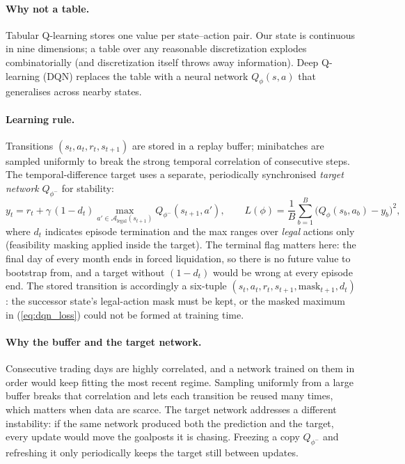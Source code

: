 \paragraph{Why not a table.} Tabular Q-learning stores one value per
state--action pair. Our state is continuous in nine dimensions; a table
over any reasonable discretization explodes combinatorially (and
discretization itself throws away information). Deep Q-learning (DQN)
replaces the table with a neural network $Q_\phi(s,a)$ that generalises
across nearby states.

\paragraph{Learning rule.} Transitions $(s_t,a_t,r_t,s_{t+1})$ are stored
in a replay buffer; minibatches are sampled uniformly to break the strong
temporal correlation of consecutive steps. The temporal-difference target
uses a separate, periodically synchronised \emph{target network}
$Q_{\phi^-}$ for stability:
\begin{equation}
y_t = r_t + \gamma\, (1-d_t) \max_{a' \in \mathcal{A}_{\mathrm{legal}}(s_{t+1})}
      Q_{\phi^-}(s_{t+1}, a'),
\qquad
L(\phi) = \frac{1}{B}\sum_{b=1}^{B} \bigl( Q_\phi(s_b,a_b) - y_b \bigr)^2 ,
\label{eq:dqn_loss}
\end{equation}
where $d_t$ indicates episode termination and the max ranges over
\emph{legal} actions only (feasibility masking applied inside the target).
The terminal flag matters here: the final day of every month ends in
forced liquidation, so there is no future value to bootstrap from, and a
target without $(1-d_t)$ would be wrong at every episode end. The stored
transition is accordingly a six-tuple
$(s_t, a_t, r_t, s_{t+1}, \mathrm{mask}_{t+1}, d_t)$: the successor
state's legal-action mask must be kept, or the masked maximum in
(\ref{eq:dqn_loss}) could not be formed at training time.

\paragraph{Why the buffer and the target network.} Consecutive trading
days are highly correlated, and a network trained on them in order would
keep fitting the most recent regime. Sampling uniformly from a large
buffer breaks that correlation and lets each transition be reused many
times, which matters when data are scarce. The target network addresses a
different instability: if the same network produced both the prediction
and the target, every update would move the goalposts it is chasing.
Freezing a copy $Q_{\phi^-}$ and refreshing it only periodically keeps
the target still between updates.

